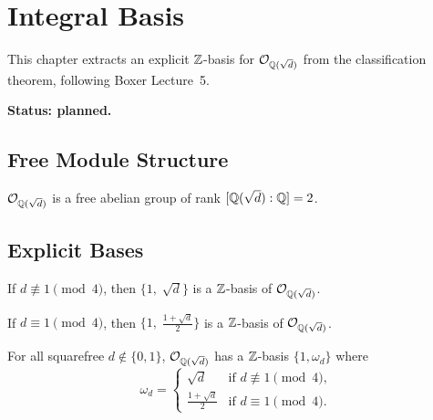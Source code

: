 \chapter{Integral Basis}\label{ch:integral-basis}

This chapter extracts an explicit $\mathbb{Z}$-basis for $\mathcal{O}_{\mathbb{Q}(\sqrt{d})}$ from
the classification theorem, following Boxer Lecture~5.

\textbf{Status: planned.}

\section{Free Module Structure}

\begin{theorem}
  \label{thm:plan_free_module}
  \notready
  $\mathcal{O}_{\mathbb{Q}(\sqrt{d})}$ is a free abelian group of rank $[\mathbb{Q}(\sqrt{d}):\mathbb{Q}] = 2$.
\end{theorem}

\section{Explicit Bases}

\begin{proposition}
  \label{prop:plan_basis_ne_one}
  \notready
  If $d\not\equiv 1\pmod{4}$, then $\{1,\;\sqrt{d}\}$ is
  a $\mathbb{Z}$-basis of $\mathcal{O}_{\mathbb{Q}(\sqrt{d})}$.
\end{proposition}

\begin{proposition}
  \label{prop:plan_basis_one}
  \notready
  If $d\equiv 1\pmod{4}$, then
  $\bigl\{1,\;\frac{1+\sqrt{d}}{2}\bigr\}$ is a $\mathbb{Z}$-basis
  of $\mathcal{O}_{\mathbb{Q}(\sqrt{d})}$.
\end{proposition}

\begin{corollary}
  \label{cor:plan_unified_basis}
  \notready
  For all squarefree $d\notin\{0,1\}$, $\mathcal{O}_{\mathbb{Q}(\sqrt{d})}$ has a $\mathbb{Z}$-basis
  $\{1,\omega_d\}$ where
  \[
    \omega_d =
    \begin{cases}
      \sqrt{d} & \text{if } d\not\equiv 1\pmod{4},\\
      \frac{1+\sqrt{d}}{2} & \text{if } d\equiv 1\pmod{4}.
    \end{cases}
  \]
\end{corollary}

